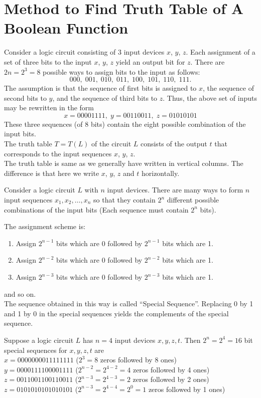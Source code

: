 \documentclass[../main-sheet.tex]{subfiles}
\begin{document}
\section{Method to Find Truth Table of A Boolean Function}
Consider a logic circuit consisting of 3 input devices $ x  $, $ y $, $ z $. Each assignment of a set of three bits to the input $ x  $, $ y $, $ z $ yield an output bit for $ z $. There are $ 2n = 2^3 = 8 $ possible ways to assign bits to the input as follows:
\[
    000,\;001,\;010,\;011,\;100,\;101,\;110,\;111.
\]
The assumption is that the sequence of first bits is assigned to $ x  $, the sequence of second bits to $ y $, and the sequence of third bits to $ z $. Thus, the above set of inputs may be rewritten in the form
\[
    x=00001111,\;y=00110011,\;z=01010101
\]
These three sequences (of 8 bits) contain the eight possible combination of the input bits.\\
The truth table $ T = T(L) $ of the circuit $ L $ consists of the output $ t $ that corresponds to the input sequences $ x $, $ y $, $ z $.\\
The truth table is same as we generally have written in vertical columns. The difference is that here we write $ x $, $ y $, $ z $ and $ t $ horizontally.

Consider a logic circuit $ L $ with $ n $ input devices. There are many ways to form $ n $ input sequences $ x_1, x_2,\dots,x_n $ so that they contain $ 2^n $ different possible combinations of the input bits (Each sequence must contain $ 2^n $ bits).


The assignment scheme is:
\begin{enumerate}[label=$ x_\arabic* $:]
    \item Assign $ 2^{n-1} $ bits which are 0 followed by $ 2^{n-1} $ bits which are 1.
    \item Assign $ 2^{n-2} $ bits which are 0 followed by $ 2^{n-2} $ bits which are 1.
    \item Assign $ 2^{n-3} $ bits which are 0 followed by $ 2^{n-3} $ bits which are 1.
\end{enumerate}
and so on.\\

The sequence obtained in this way is called ``Special Sequence''. Replacing 0 by 1 and 1 by 0 in the special sequences yields the complements of the special sequence.
\begin{ex}
    Suppose a logic circuit $ L $ has $ n=4 $ input devices $ x,y,z,t $. Then $ 2^n =2^4=16$ bit special sequences for $ x,y,z,t $ are\\
    $ x=0000000011111111 $ ($ 2^3=8 $ zeros followed by 8 ones)\\
    $ y=0000111100001111 $ ($ 2^{n-2}=2^{4-2}=4 $ zeros followed by 4 ones)\\
    $ z=0011001100110011 $ ($ 2^{n-3}=2^{4-3}=2 $ zeros followed by 2 ones)\\
    $ z=0101010101010101 $ ($ 2^{n-3}=2^{4-4}=2^0=1 $ zeros followed by 1 ones)
\end{ex}
\end{document}
